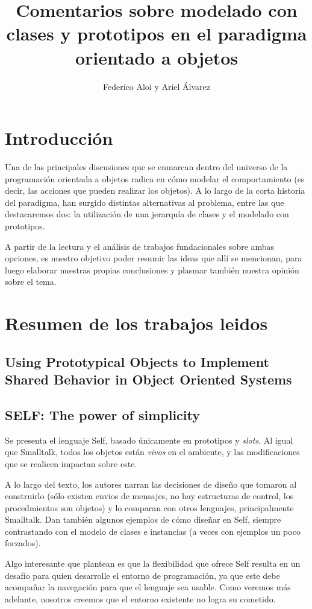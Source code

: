 \documentclass[a4paper,10pt]{article}
\title{Comentarios sobre modelado con clases y prototipos en el paradigma orientado a objetos}
\author{Federico Aloi y Ariel Álvarez}
\begin{document}
\maketitle

\section{Introducción}
Una de las principales discusiones que se enmarcan dentro del universo de la programación orientada a objetos radica en cómo modelar el comportamiento (es decir, las acciones que pueden realizar los objetos). A lo largo de la corta historia del paradigma, han surgido distintas alternativas al problema, entre las que destacaremos dos: la utilización de una jerarquía de clases y el modelado con prototipos.

A partir de la lectura y el análisis de trabajos fundacionales sobre ambas opciones, es nuestro objetivo poder resumir las ideas que allí se mencionan, para luego elaborar nuestras propias conclusiones y plasmar también nuestra opinión sobre el tema.

\section{Resumen de los trabajos leidos}

\subsection{Using Prototypical Objects to Implement Shared Behavior in Object Oriented Systems}

\subsection{SELF: The power of simplicity}
Se presenta el lenguaje Self, basado únicamente en prototipos y \textit{slots}. Al igual que Smalltalk, todos los objetos están \textit{vivos} en el ambiente, y las modificaciones que se realicen impactan sobre este.

A lo largo del texto, los autores narran las decisiones de diseño que tomaron al construirlo (sólo existen envios de mensajes, no hay estructuras de control, los procedmientos son objetos) y lo comparan con otros lenguajes, principalmente Smalltalk. Dan también algunos ejemplos de cómo diseñar en Self, siempre contrastando con el modelo de clases e instancias (a veces con ejemplos un poco forzados).

Algo interesante que plantean es que la flexibilidad que ofrece Self resulta en un desafío para quien desarrolle el entorno de programación, ya que este debe acompañar la navegación para que el lenguaje sea usable. Como veremos más adelante, nosotros creemos que el entorno existente no logra su cometido.
\end{document}
